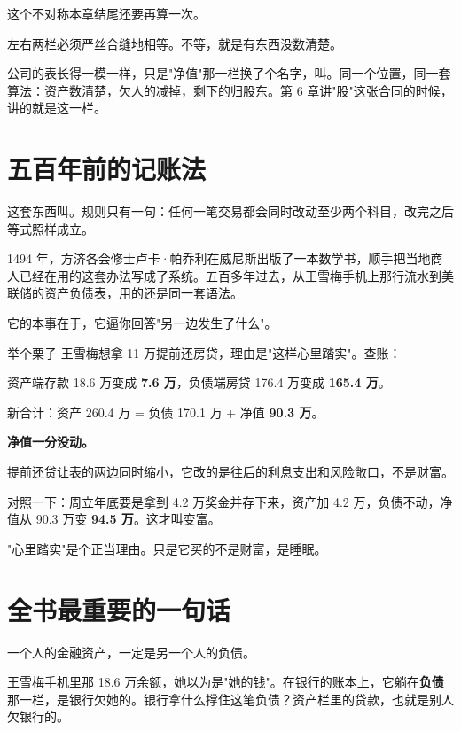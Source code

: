 这个不对称本章结尾还要再算一次。

左右两栏必须严丝合缝地相等。不等，就是有东西没数清楚。

公司的表长得一模一样，只是"净值"那一栏换了个名字，叫。同一个位置，同一套算法：资产数清楚，欠人的减掉，剩下的归股东。第 6 章讲"股"这张合同的时候，讲的就是这一栏。

\section{五百年前的记账法}

这套东西叫。规则只有一句：任何一笔交易都会同时改动至少两个科目，改完之后等式照样成立。

1494 年，方济各会修士卢卡·帕乔利在威尼斯出版了一本数学书，顺手把当地商人已经在用的这套办法写成了系统。五百多年过去，从王雪梅手机上那行流水到美联储的资产负债表，用的还是同一套语法。

它的本事在于，它逼你回答"另一边发生了什么"。

\begin{egbox}{举个栗子}
王雪梅想拿 11 万提前还房贷，理由是"这样心里踏实"。查账：

资产端存款 18.6 万变成 \textbf{7.6 万}，负债端房贷 176.4 万变成 \textbf{165.4 万}。

新合计：资产 260.4 万 = 负债 170.1 万 + 净值 \textbf{90.3 万}。

\textbf{净值一分没动。}

提前还贷让表的两边同时缩小，它改的是往后的利息支出和风险敞口，不是财富。

对照一下：周立年底要是拿到 4.2 万奖金并存下来，资产加 4.2 万，负债不动，净值从 90.3 万变 \textbf{94.5 万}。这才叫变富。

"心里踏实"是个正当理由。只是它买的不是财富，是睡眠。

\end{egbox}

\section{全书最重要的一句话}

\begin{pullquote}{}
一个人的金融资产，一定是另一个人的负债。
\end{pullquote}

王雪梅手机里那 18.6 万余额，她以为是"她的钱"。在银行的账本上，它躺在\textbf{负债}那一栏，是银行欠她的。银行拿什么撑住这笔负债？资产栏里的贷款，也就是别人欠银行的。

